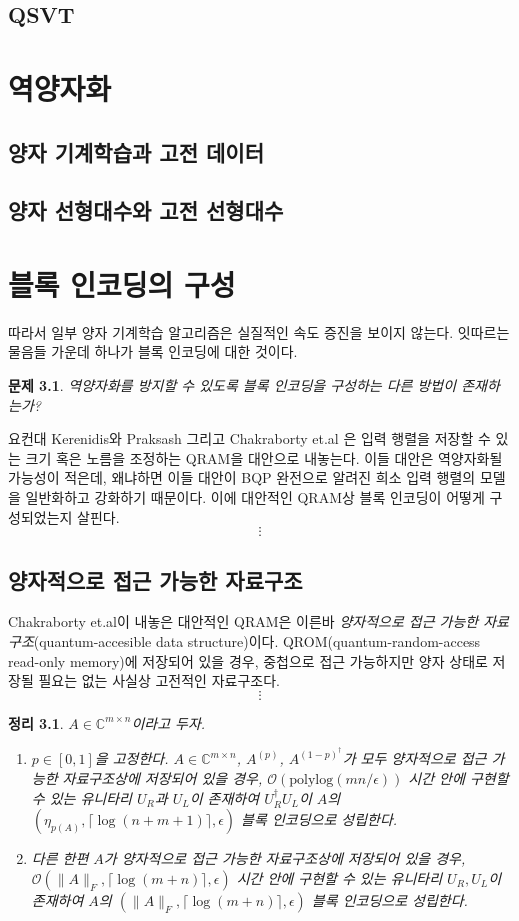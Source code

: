 \documentclass[hidelinks,article,a4paper,chapter,twocolumn]{oblivoir}
\newtheorem{theo}{정리}[chapter]
\newtheorem{prob}{문제}[chapter]
\let\oldbibliography
\renewcommand{}[1]{{%
\let\chapter\section
\oldbibliography{#1}}}
\begin{document}
\section{QSVT}
\chapter{역양자화}
\section{양자 기계학습과 고전 데이터}
\section{양자 선형대수와 고전 선형대수}
\chapter{블록 인코딩의 구성}
따라서 일부 양자 기계학습 알고리즘은 실질적인 속도 증진을 보이지 않는다. 잇따르는
물음들 가운데 하나가 블록 인코딩에 대한 것이다.
\begin{prob}
  역양자화를 방지할 수 있도록 블록 인코딩을 구성하는 다른 방법이 존재하는가?
\end{prob}
요컨대 Kerenidis와 Praksash \cite{kerenidis2020} 그리고 Chakraborty 
et.al \cite{chakraborty2018}은 입력 행렬을 저장할 수 있는 크기 혹은 노름을 조정하는
QRAM을 대안으로 내놓는다. 이들 대안은 역양자화될 가능성이 적은데, 왜냐하면
이들 대안이 BQP 완전으로 알려진 \cite{HHL2009} 희소 입력 행렬의 모델을 일반화하고
강화하기 때문이다. 이에 대안적인 QRAM상 블록 인코딩이 어떻게 구성되었는지 살핀다.
\[\pmb{\vdots}\]
\section{양자적으로 접근 가능한 자료구조}
Chakraborty et.al이 내놓은 대안적인 QRAM은 이른바 \emph{양자적으로 접근 가능한
자료구조}(quantum-accesible data structure)이다. QROM(quantum-random-access
read-only memory)에 저장되어 있을 경우,
중첩으로 접근 가능하지만 양자 상태로 저장될 필요는 없는 사실상 고전적인
자료구조다. 
\[\pmb{\vdots}\]
\begin{theo}
  $A\in\mathbb{C}^{m\times n}$이라고 두자. 
  \begin{enumerate}[label=(\roman*)]
    \item $p\in[0,1]$을 고정한다. $A\in\mathbb{C}^{m\times n}$, $A^(p)$, 
      $A^{(1-p)^{\dagger}}$가 모두 양자적으로 접근 가능한 자료구조상에 저장되어
      있을 경우, $\mathcal{O}(\textrm{polylog}(mn/\epsilon))$ 시간 안에
      구현할 수 있는 유니타리 $U_R$과 $U_L$이 존재하여 $U_R^{\dagger}U_L$이
      $A$의 $(\eta_{p(A)},\lceil\log(n+m+1)\rceil,\epsilon)$ 블록 인코딩으로
      성립한다.
    \item 다른 한편 $A$가 양자적으로 접근 가능한 자료구조상에 저장되어
      있을 경우, $\mathcal{O}(\|A\|_F,\lceil\log(m+n)\rceil, \epsilon)$
      시간 안에 구현할 수 있는 유니타리 $U_R,U_L$이 존재하여 $A$의
      $(\|A\|_F,\lceil\log(m+n)\rceil,\epsilon)$ 블록 인코딩으로 성립한다.
  \end{enumerate}
\end{theo}


\end{document}
